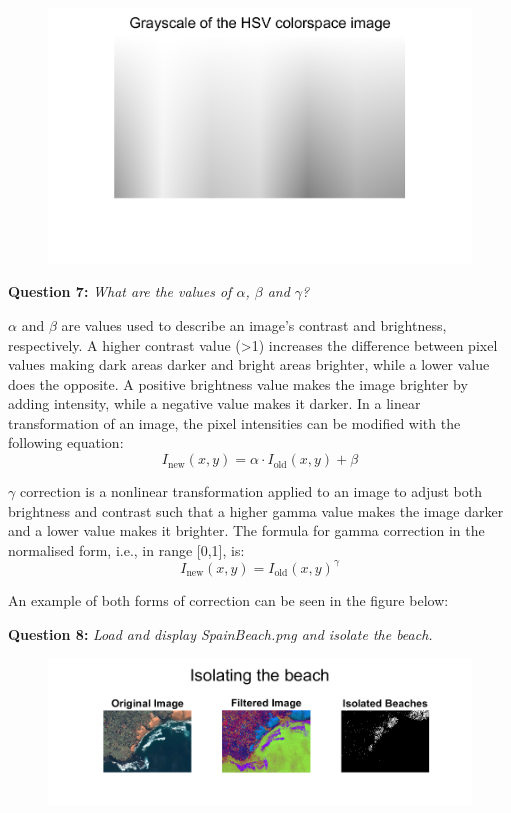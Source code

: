 \begin{figure}[H]
    \centering
    \includegraphics[width=0.5\linewidth]{Doc/Graphics/Part1/Part1_Question6b.png}
    \label{fig:enter-label}
\end{figure}



\textbf{Question 7:}
\textit{What are the values of $\alpha$, $\beta$ and $\gamma$?}

$\alpha$ and $\beta$ are values used to describe an image's contrast and brightness, respectively. 
A higher contrast value (>1) increases the difference between pixel values making dark areas darker and bright areas brighter, while a lower value does the opposite. A positive brightness value makes the image brighter by adding intensity, while a negative value makes it darker.
In a linear transformation of an image, the pixel intensities can be modified with the following equation:
\[
I_{\text{new}}(x, y) = \alpha \cdot I_{\text{old}}(x, y) + \beta
\]

$\gamma$ correction is a nonlinear transformation applied to an image to adjust both brightness and contrast such that a higher gamma value makes the image darker and a lower value makes it brighter. The formula for gamma correction in the normalised form, i.e., in range [0,1], is:
\[
I_{\text{new}}(x, y) = I_{\text{old}}(x, y)^\gamma
\]

An example of both forms of correction can be seen in the figure below:



\newpage
\textbf{Question 8:}
\textit{Load and display SpainBeach.png and isolate the beach.}


\begin{figure}[H]
    \centering
    \includegraphics[width=\linewidth]{Doc/Graphics/Part1/Part1_Question8.png}
    \label{fig:enter-label}
\end{figure}



